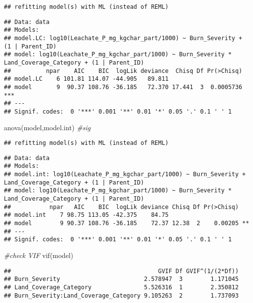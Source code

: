 \documentclass[
]{article}
\newenvironment{Shaded}{\begin{snugshade}}{\end{snugshade}}
\newcommand{\CommentTok}[1]{\textcolor[rgb]{0.56,0.35,0.01}{\textit{#1}}}
\newcommand{\FunctionTok}[1]{\textcolor[rgb]{0.00,0.00,0.00}{#1}}
\newcommand{\NormalTok}[1]{#1}
\begin{document}
\begin{verbatim}
## refitting model(s) with ML (instead of REML)
\end{verbatim}

\begin{verbatim}
## Data: data
## Models:
## model.LC: log10(Leachate_P_mg_kgchar_part/1000) ~ Burn_Severity + (1 | Parent_ID)
## model: log10(Leachate_P_mg_kgchar_part/1000) ~ Burn_Severity * Land_Coverage_Category + (1 | Parent_ID)
##          npar    AIC    BIC  logLik deviance  Chisq Df Pr(>Chisq)    
## model.LC    6 101.81 114.07 -44.905   89.811                         
## model       9  90.37 108.76 -36.185   72.370 17.441  3  0.0005736 ***
## ---
## Signif. codes:  0 '***' 0.001 '**' 0.01 '*' 0.05 '.' 0.1 ' ' 1
\end{verbatim}

\begin{Shaded}
\begin{Highlighting}[]
\FunctionTok{anova}\NormalTok{(model,model.int) }\CommentTok{\#sig}
\end{Highlighting}
\end{Shaded}

\begin{verbatim}
## refitting model(s) with ML (instead of REML)
\end{verbatim}

\begin{verbatim}
## Data: data
## Models:
## model.int: log10(Leachate_P_mg_kgchar_part/1000) ~ Burn_Severity + Land_Coverage_Category + (1 | Parent_ID)
## model: log10(Leachate_P_mg_kgchar_part/1000) ~ Burn_Severity * Land_Coverage_Category + (1 | Parent_ID)
##           npar   AIC    BIC  logLik deviance Chisq Df Pr(>Chisq)   
## model.int    7 98.75 113.05 -42.375    84.75                       
## model        9 90.37 108.76 -36.185    72.37 12.38  2    0.00205 **
## ---
## Signif. codes:  0 '***' 0.001 '**' 0.01 '*' 0.05 '.' 0.1 ' ' 1
\end{verbatim}

\begin{Shaded}
\begin{Highlighting}[]
\CommentTok{\#check VIF}
\FunctionTok{vif}\NormalTok{(model)}
\end{Highlighting}
\end{Shaded}

\begin{verbatim}
##                                          GVIF Df GVIF^(1/(2*Df))
## Burn_Severity                        2.578947  3        1.171045
## Land_Coverage_Category               5.526316  1        2.350812
## Burn_Severity:Land_Coverage_Category 9.105263  2        1.737093
\end{verbatim}
\end{document}
